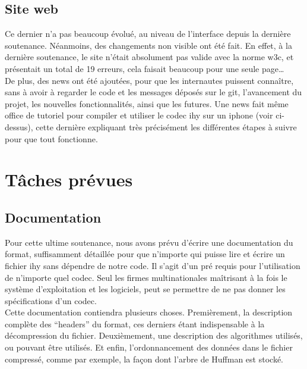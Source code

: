 \documentclass[a4paper,12pt]{article}
\begin{document}
	\subsection{Site web}
Ce dernier n'a pas beaucoup évolué, au niveau de l'interface depuis la dernière
soutenance. Néanmoins, des changements non visible ont été fait. En effet, à la
dernière soutenance, le site n'était absolument pas valide avec la norme w3c, et
présentait un total de 19 erreurs, cela faisait beaucoup pour une seule
page\ldots\\
De plus, des news ont été ajoutées, pour que les internautes puissent connaître,
sans à avoir à regarder le code et les messages déposés sur le git, l'avancement
du projet, les nouvelles fonctionnalités, ainsi que les futures. Une news fait
même office de tutoriel pour compiler et utiliser le codec ihy sur un iphone
(voir ci-dessus), cette dernière expliquant très précisément les différentes
étapes à suivre pour que tout fonctionne.

\newpage

\section{Tâches prévues}
	\subsection{Documentation}
Pour cette ultime soutenance, nous avons prévu d'écrire une documentation du
format, suffisamment détaillée pour que n'importe qui puisse lire et écrire un
fichier ihy sans dépendre de notre code. Il s'agit d'un pré requis pour
l'utilisation de n'importe quel codec. Seul les firmes multinationales
maîtrisant à la fois le système d'exploitation et les logiciels, peut se
permettre de ne pas donner les spécifications d'un codec.\\
Cette documentation contiendra plusieurs choses. Premièrement, la description
complète des ``headers'' du format, ces derniers étant indispensable à la
décompression du fichier. Deuxièmement, une description des algorithmes
utilisés, ou pouvant être utilisés. Et enfin, l'ordonnancement des données dans
le fichier compressé, comme par exemple, la façon dont l'arbre de Huffman est
stocké.
\end{document}
